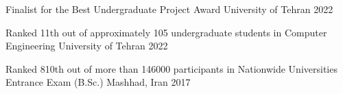 




\begin{cvhonors}
  \cvhonor
    {Finalist} %
    {for the Best Undergraduate Project Award \href{https://drive.google.com/file/d/1yCU6lWuyVT_TECAdWHKk4iWTs2WNt4Wb/view?usp=sharing}{\faExternalLink}} %
    {University of Tehran} %
    {2022} %

  \cvhonor
    {Ranked 11th} %
    {out of approximately 105 undergraduate students in Computer Engineering} %
    {University of Tehran} %
    {2022} %
    
  \cvhonor
    {Ranked 810th} %
    {out of more than 146000 participants in Nationwide Universities Entrance Exam (B.Sc.)} %
    {Mashhad, Iran} %
    {2017} %

\end{cvhonors}







